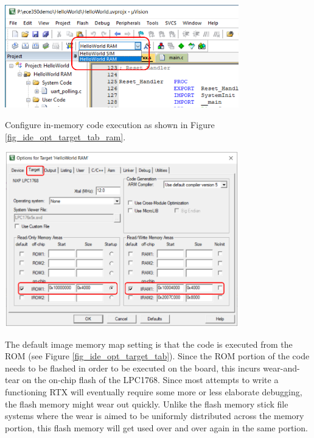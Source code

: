 \begin{enumerate}
          \begin{minipage}{\linewidth}
            \centering
            \includegraphics[width=4in]{figure/uv5/IDE_target_ram}
            \label{fig_ide_target_ram}
          \end{minipage}
        Configure in-memory code execution as shown in Figure \ref{fig_ide_opt_target_tab_ram}. \par
          \begin{minipage}{\linewidth}
            \centering
            \includegraphics[width=4in]{figure/uv5/IDE_opt_target_tab_ram}
            \label{fig_ide_opt_target_tab_ram}
          \end{minipage}

        The default image memory map setting is that the code is executed from the ROM (see Figure \ref{fig_ide_opt_target_tab}). Since the ROM portion of the code needs to be flashed in order to be executed on the board, this incurs wear-and-tear on the on-chip flash of the LPC1768. Since most attempts to write a functioning RTX will eventually require some more or less elaborate debugging, the flash memory might wear out quickly. Unlike the flash memory stick file systems where the wear is aimed to be uniformly distributed across the memory portion, this flash memory will get used over and over again in the same portion.


\end{enumerate}
